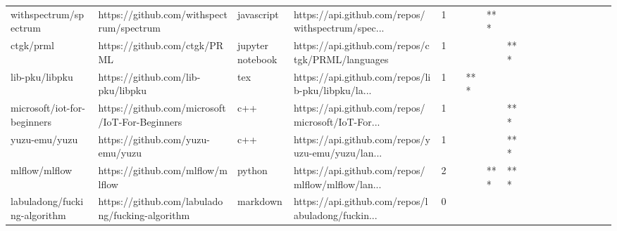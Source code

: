 \begin{tabular}{llllrlllllllllllll}
withspectrum/spectrum                              &           https://github.com/withspectrum/spectrum &        javascript &  https://api.github.com/repos/withspectrum/spec... &       1 &         &        &       *** &                &                 &        &           &           &          &          &       &              &          \\
ctgk/prml                                          &                       https://github.com/ctgk/PRML &  jupyter notebook &   https://api.github.com/repos/ctgk/PRML/languages &       1 &         &        &           &            *** &                 &        &           &           &          &          &       &              &          \\
lib-pku/libpku                                     &                  https://github.com/lib-pku/libpku &               tex &  https://api.github.com/repos/lib-pku/libpku/la... &       1 &         &    *** &           &                &                 &        &           &           &          &          &       &              &          \\
microsoft/iot-for-beginners                        &     https://github.com/microsoft/IoT-For-Beginners &               c++ &  https://api.github.com/repos/microsoft/IoT-For... &       1 &         &        &           &            *** &                 &        &           &           &          &          &       &              &          \\
yuzu-emu/yuzu                                      &                   https://github.com/yuzu-emu/yuzu &               c++ &  https://api.github.com/repos/yuzu-emu/yuzu/lan... &       1 &         &        &           &            *** &                 &        &           &           &          &          &       &              &          \\
mlflow/mlflow                                      &                   https://github.com/mlflow/mlflow &            python &  https://api.github.com/repos/mlflow/mlflow/lan... &       2 &         &        &       *** &            *** &                 &        &           &           &          &          &       &              &          \\
labuladong/fucking-algorithm                       &    https://github.com/labuladong/fucking-algorithm &          markdown &  https://api.github.com/repos/labuladong/fuckin... &       0 &         &        &           &                &                 &        &           &           &          &          &       &              &          \\

\end{tabular}
